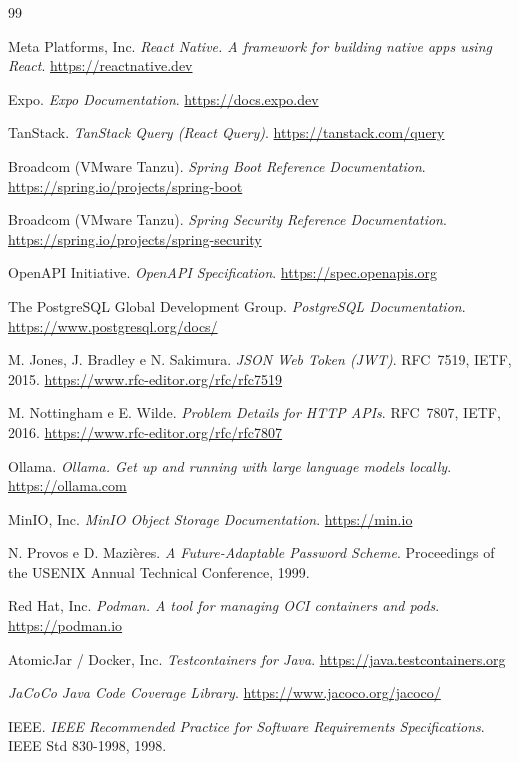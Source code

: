 \begin{thebibliography}{99}

 Meta Platforms, Inc. \emph{React Native. A framework for building native apps using React}. \url{https://reactnative.dev}

 Expo. \emph{Expo Documentation}. \url{https://docs.expo.dev}

 TanStack. \emph{TanStack Query (React Query)}. \url{https://tanstack.com/query}

 Broadcom (VMware Tanzu). \emph{Spring Boot Reference Documentation}. \url{https://spring.io/projects/spring-boot}

 Broadcom (VMware Tanzu). \emph{Spring Security Reference Documentation}. \url{https://spring.io/projects/spring-security}

 OpenAPI Initiative. \emph{OpenAPI Specification}. \url{https://spec.openapis.org}

 The PostgreSQL Global Development Group. \emph{PostgreSQL Documentation}. \url{https://www.postgresql.org/docs/}

 M. Jones, J. Bradley e N. Sakimura. \emph{JSON Web Token (JWT)}. RFC~7519, IETF, 2015. \url{https://www.rfc-editor.org/rfc/rfc7519}

 M. Nottingham e E. Wilde. \emph{Problem Details for HTTP APIs}. RFC~7807, IETF, 2016. \url{https://www.rfc-editor.org/rfc/rfc7807}

 Ollama. \emph{Ollama. Get up and running with large language models locally}. \url{https://ollama.com}

 MinIO, Inc. \emph{MinIO Object Storage Documentation}. \url{https://min.io}

 N. Provos e D. Mazières. \emph{A Future-Adaptable Password Scheme}. Proceedings of the USENIX Annual Technical Conference, 1999.

 Red Hat, Inc. \emph{Podman. A tool for managing OCI containers and pods}. \url{https://podman.io}

 AtomicJar / Docker, Inc. \emph{Testcontainers for Java}. \url{https://java.testcontainers.org}

 \emph{JaCoCo Java Code Coverage Library}. \url{https://www.jacoco.org/jacoco/}

 IEEE. \emph{IEEE Recommended Practice for Software Requirements Specifications}. IEEE Std 830-1998, 1998.


\end{thebibliography}
